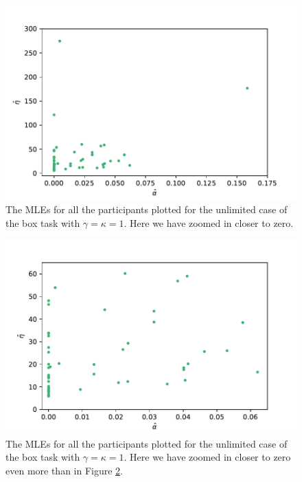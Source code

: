 \begin{figure}
    \centering
    \includegraphics[scale=0.7]{pictures/plotted_mles_unlim_gk1_zoom1.pdf}
    \caption[MLEs of $\alpha$ and $\eta$, unlimited with $\gamma=\kappa=1$, zoomed.]{The MLEs for all the participants plotted for the unlimited case of the box task with $\gamma=\kappa=1$. Here we have zoomed in closer to zero.}
    \label{fig:plot_all_mles_unlim_zoom1}
\end{figure}

\begin{figure}
    \centering
    \includegraphics[scale=0.7]{pictures/plotted_mles_unlim_gk1_zoom2.pdf}
    \caption[MLEs of $\alpha$ and $\eta$, unlimited with $\gamma=\kappa=1$, zoomed more]{The MLEs for all the participants plotted for the unlimited case of the box task with $\gamma=\kappa=1$. Here we have zoomed in closer to zero even more than in Figure \ref{fig:plot_all_mles_unlim_zoom2}.}
    \label{fig:plot_all_mles_unlim_zoom2}
\end{figure}

